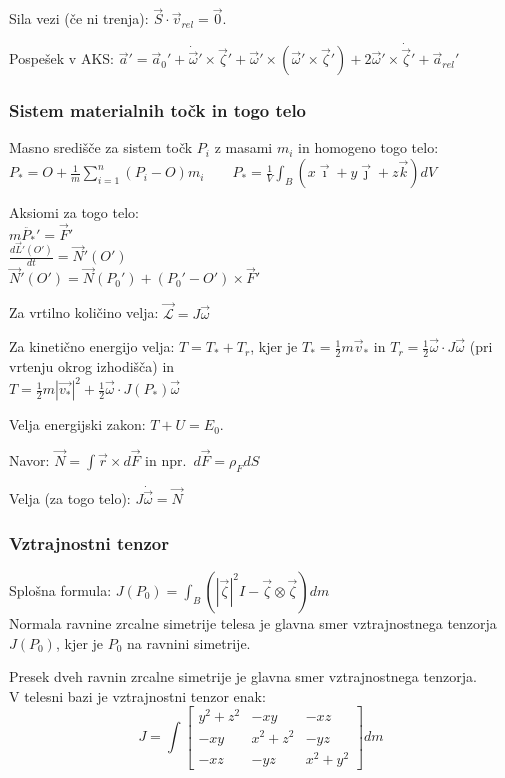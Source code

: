 \documentclass[a4paper,10pt]{article}
\theoremstyle{definition}
\newcommand{\vzeta}{\vec{\zeta}}
\newcommand{\dzeta}{\dot{\vzeta}}
\newcommand{\vomega}{\vec{\omega}}
\newcommand{\domega}{\dot{\vomega}}
\newcommand{\va}{\vec{a}}
\newcommand{\Pt}{P_{\ast}}
\begin{document}
Sila vezi (če ni trenja): $\vec{S} \cdot \vec{v}_{rel} = \vec{0}.$

Pospešek v AKS: $\va' = \va_0' + \domega' \times \vzeta' + \vomega' \times (\vomega' \times \vzeta') + 2 \vomega'\times\dzeta' + \va_{rel}'$

\subsubsection*{Sistem materialnih točk in togo telo}
Masno središče za sistem točk $P_i$ z masami $m_i$ in homogeno togo telo: \\
$ \displaystyle \Pt = O + \frac1m \sum_{i=1}^n (P_i - O) m_i \qquad \Pt =
\frac1V \int_B (x\vec{\imath} + y\vec{\jmath} + z\vec{k})dV $

Aksiomi za togo telo: \\
$m\ddot{\Pt}' = \vec{F}'$ \\
$\displaystyle \frac{d\vec{L}'(O')}{dt} = \vec{N}'(O')$ \\
$\vec{N}'(O') = \vec{N}(P_0') + (P_0' - O') \times \vec{F}'$

Za vrtilno količino velja: $\vec{\mathcal{L}} = J \vec{\omega}$

Za kinetično energijo velja:
$T = T_\ast + T_r$, kjer je $T_\ast = \frac12 m\vec{v}_\ast$ in $T_r = \frac12 \vomega \cdot J \vomega$  (pri vrtenju okrog izhodišča) in \\
$T = \frac{1}{2} m |\vec{v_*}|^2 + \frac{1}{2} \vec{\omega} \cdot J(\Pt) \vec{\omega}$

Velja energijski zakon: $T + U = E_0$.

Navor: $\vec{N} = \int \vec{r} \times d\vec{F}$ in npr.\ $d\vec{F} = \rho_F dS$

Velja (za togo telo): $J \domega = \vec{N}$

\subsubsection*{Vztrajnostni tenzor}
Splošna formula: $J(P_0) = \int_B (|\vec{\zeta}|^2 I - \vec{\zeta} \otimes \vec{\zeta} ) dm$\\

Normala ravnine zrcalne simetrije telesa je glavna smer vztrajnostnega tenzorja $J(P_0)$, kjer je $P_0$ na ravnini simetrije.

Presek dveh ravnin zrcalne simetrije je glavna smer vztrajnostnega tenzorja.\\

V telesni bazi je vztrajnostni tenzor enak:
\[ J = \int
  \begin{bmatrix}
    y^2 + z^2 & -xy & -xz \\
    -xy & x^2 + z^2 & -yz \\
    -xz & -yz & x^2 + y^2
\end{bmatrix} dm \]
\end{document}
